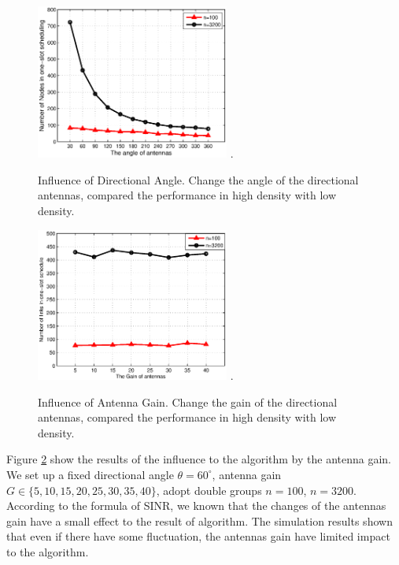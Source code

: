 \documentclass[conference]{IEEEtran}
\begin{document}
\begin{figure}[htpb]
\centering
\includegraphics[width=2.5in]{image/3.eps}
\DeclareGraphicsExtensions.
\caption{Influence of Directional Angle. Change the angle of the directional antennas, compared the performance in high density with low density.}
\label{Influence of Directional Angle}
\end{figure}

\begin{figure}[!t]
\centering
\includegraphics[width=2.5in]{image/4.eps}
\DeclareGraphicsExtensions.
\caption{Influence of Antenna Gain. Change the gain of the directional antennas, compared the performance in high density with low density.}
\label{Influence of Antenna Gain}
\end{figure}

Figure \ref{Influence of Antenna Gain} show the results of the influence to the algorithm by the antenna gain. We set up a fixed directional angle $\theta=60^{\circ}$, antenna gain $G \in \{5,10,15,20,25,30,35,40\}$, adopt double groups $n=100$, $n=3200$. According to the formula of SINR, we known that the changes of the antennas gain have a small effect to the result of algorithm. The simulation results shown that even if there have some fluctuation, the antennas gain have limited impact to the algorithm.
\end{document}
